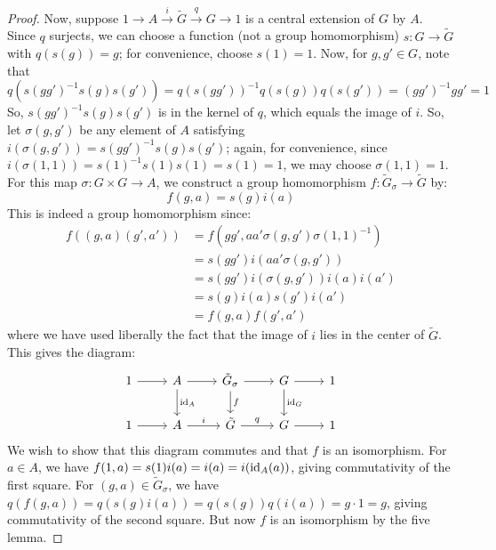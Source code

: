\begin{proof}
	Now, suppose $1 \to A \xrightarrow{i} \tilde{G} \xrightarrow{q} G \to 1$ is a central extension of $G$ by $A$. Since $q$ surjects, we can choose a function (not a group homomorphism) $s : G \to \tilde{G}$ with $q(s(g)) = g$; for convenience, choose $s(1) = 1$. Now, for $g,g' \in G$, note that
	\[ q(s(gg')^{-1}s(g)s(g')) = q(s(gg'))^{-1}q(s(g))q(s(g')) = (gg')^{-1}gg' = 1 \]
	So, $s(gg')^{-1}s(g)s(g')$ is in the kernel of $q$, which equals the image of $i$. So, let $\sigma(g,g')$ be any element of $A$ satisfying $i(\sigma(g,g')) = s(gg')^{-1}s(g)s(g')$; again, for convenience, since $i(\sigma(1,1)) = s(1)^{-1}s(1)s(1) = s(1) = 1$, we may choose $\sigma(1,1) = 1$. For this map $\sigma : G \times G \to A$, we construct a group homomorphism $f : \tilde{G}_\sigma \to \tilde{G}$ by:
	\[ f(g,a) = s(g)i(a) \]
	This is indeed a group homomorphism since:
	\begin{align*}
	f((g,a)(g',a'))
		&= f(gg',aa'\sigma(g,g')\sigma(1,1)^{-1}) \\
		&= s(gg')i(aa'\sigma(g,g')) \\
		&= s(gg')i(\sigma(g,g'))i(a)i(a') \\
		&= s(g)i(a)s(g')i(a') \\
		&= f(g,a)f(g',a')
	\end{align*}
	where we have used liberally the fact that the image of $i$ lies in the center of $\tilde{G}$. This gives the diagram:
	\[ \begin{tikzcd} 1 \arrow{r}{} & A \arrow{d}{\id_A} \arrow{r}{} & \tilde{G}_\sigma \arrow{r}{} \arrow{d}{f} & G \arrow{d}{\id_G} \arrow{r}{} & 1 \\ 1 \arrow{r}{} & A \arrow{r}{i} & \tilde{G} \arrow{r}{q} & G \arrow{r}{} & 1 \end{tikzcd} \]
	We wish to show that this diagram commutes and that $f$ is an isomorphism. For $a \in A$, we have $f(1,a) = s(1)i(a) = i(a) = i(\operatorname{id}_A(a))$, giving commutativity of the first square. For $(g,a) \in \tilde{G}_\sigma$, we have $q(f(g,a)) = q(s(g)i(a)) = q(s(g))q(i(a)) = g \cdot 1 = g$, giving commutativity of the second square. But now $f$ is an isomorphism by the five lemma.
	

\end{proof}
